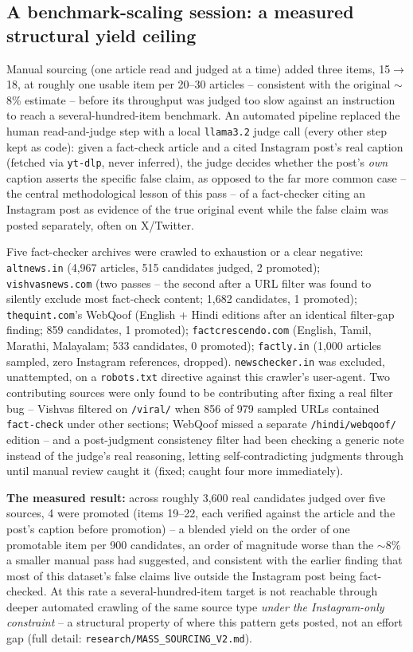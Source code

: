 \documentclass[conference]{IEEEtran}
\begin{document}
\subsection{A benchmark-scaling session: a measured structural yield ceiling}
\label{sec:massSourcing}
Manual sourcing (one article read and judged at a time) added three
items, 15$\to$18, at roughly one usable item per 20--30 articles --
consistent with the original $\sim$8\% estimate -- before its throughput
was judged too slow against an instruction to reach a several-hundred-item
benchmark. An automated pipeline replaced the human read-and-judge step
with a local \texttt{llama3.2} judge call (every other step kept as
code): given a fact-check article and a cited Instagram post's real
caption (fetched via \texttt{yt-dlp}, never inferred), the judge decides
whether the post's \emph{own} caption asserts the specific false claim,
as opposed to the far more common case -- the central methodological
lesson of this pass -- of a fact-checker citing an Instagram post as
evidence of the true original event while the false claim was posted
separately, often on X/Twitter.

Five fact-checker archives were crawled to exhaustion or a clear
negative: \texttt{altnews.in} (4{,}967 articles, 515 candidates judged,
2 promoted); \texttt{vishvasnews.com} (two passes -- the second after a
URL filter was found to silently exclude most fact-check content;
1{,}682 candidates, 1 promoted); \texttt{thequint.com}'s WebQoof
(English + Hindi editions after an identical filter-gap finding; 859
candidates, 1 promoted); \texttt{factcrescendo.com} (English, Tamil,
Marathi, Malayalam; 533 candidates, 0 promoted); \texttt{factly.in}
(1{,}000 articles sampled, zero Instagram references, dropped).
\texttt{newschecker.in} was excluded, unattempted, on a
\texttt{robots.txt} directive against this crawler's user-agent. Two
contributing sources were only found to be contributing after fixing a
real filter bug -- Vishvas filtered on \texttt{/viral/} when 856 of 979
sampled URLs contained \texttt{fact-check} under other sections; WebQoof
missed a separate \texttt{/hindi/webqoof/} edition -- and a
post-judgment consistency filter had been checking a generic note
instead of the judge's real reasoning, letting self-contradicting
judgments through until manual review caught it (fixed; caught four more
immediately).

\textbf{The measured result:} across roughly 3{,}600 real candidates
judged over five sources, 4 were promoted (items 19--22, each verified
against the article and the post's caption before promotion) -- a
blended yield on the order of one promotable item per 900 candidates,
an order of magnitude worse than the $\sim$8\% a smaller manual pass had
suggested, and consistent with the earlier finding that most of this
dataset's false claims live outside the Instagram post being
fact-checked. At this rate a several-hundred-item target is not
reachable through deeper automated crawling of the same source type
\emph{under the Instagram-only constraint} -- a structural property of
where this pattern gets posted, not an effort gap (full detail:
\texttt{research/MASS\_SOURCING\_V2.md}).
\end{document}
